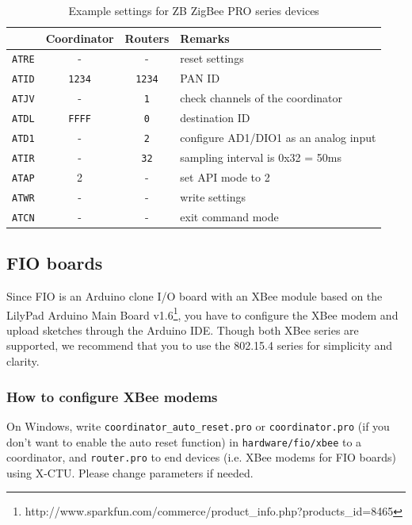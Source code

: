 \documentclass[9pt]{jsarticle}
\begin{document}
\begin{table}[htdp]
\begin{center}
\small
\begin{tabular}{|r|c|c|l|}
\hline   & Coordinator & Routers & Remarks \\\hline
\hline \texttt{ATRE} & - & - & reset settings \\
\hline \texttt{ATID} & \texttt{1234} & \texttt{1234} & PAN ID \\
\hline \texttt{ATJV} & - & \texttt{1} & check channels of the coordinator \\
\hline \texttt{ATDL} & \texttt{FFFF} & \texttt{0} & destination ID \\
\hline \texttt{ATD1} & - & \texttt{2} & configure AD1/DIO1 as an analog input \\
\hline \texttt{ATIR} & - & \texttt{32} & sampling interval is 0x32 = 50ms \\
\hline \texttt{ATAP} & 2 & - & set API mode to 2 \\
\hline \texttt{ATWR} & - & - & write settings \\
\hline \texttt{ATCN} & - & - & exit command mode \\
\hline 
\end{tabular} 
\caption{Example settings for ZB ZigBee PRO series devices}
\end{center}
\label{xbee}
\end{table}

\clearpage
\subsection{FIO boards}
Since FIO is an Arduino clone I/O board with an XBee module based on the LilyPad Arduino Main Board v1.6\footnote{http://www.sparkfun.com/commerce/product\_info.php?products\_id=8465}, you have to configure the XBee modem and upload sketches through the Arduino IDE. Though both XBee series are supported, we recommend that you to use the 802.15.4 series for simplicity and clarity.

\subsubsection{How to configure XBee modems}
On Windows, write \texttt{coordinator\_auto\_reset.pro} or \texttt{coordinator.pro} (if you don't want to enable the auto reset function) in \texttt{hardware/fio/xbee} to a coordinator, and \texttt{router.pro} to end devices (i.e. XBee modems for FIO boards) using X-CTU. Please change parameters if needed.
\end{document}
